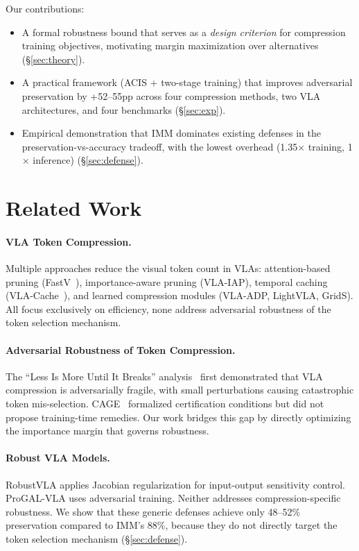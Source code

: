 \documentclass[10pt,twocolumn]{article}
\begin{document}
Our contributions:
\begin{itemize}
    \item A formal robustness bound that serves as a \emph{design criterion} for compression training objectives, motivating margin maximization over alternatives (\S\ref{sec:theory}).
    \item A practical framework (ACIS + two-stage training) that improves adversarial preservation by +52--55pp across four compression methods, two VLA architectures, and four benchmarks (\S\ref{sec:exp}).
    \item Empirical demonstration that IMM dominates existing defenses in the preservation-vs-accuracy tradeoff, with the lowest overhead (1.35$\times$ training, 1$\times$ inference) (\S\ref{sec:defense}).
\end{itemize}

\section{Related Work}
\label{sec:related}

\paragraph{VLA Token Compression.}
Multiple approaches reduce the visual token count in VLAs: attention-based pruning (FastV~\cite{chen2024fastv}), importance-aware pruning (VLA-IAP), temporal caching (VLA-Cache~\cite{zheng2024vlacache}), and learned compression modules (VLA-ADP, LightVLA, GridS). All focus exclusively on efficiency, none address adversarial robustness of the token selection mechanism.

\paragraph{Adversarial Robustness of Token Compression.}
The ``Less Is More Until It Breaks'' analysis~\cite{lessismore2025} first demonstrated that VLA compression is adversarially fragile, with small perturbations causing catastrophic token mis-selection. CAGE~\cite{cage2026} formalized certification conditions but did not propose training-time remedies. Our work bridges this gap by directly optimizing the importance margin that governs robustness.

\paragraph{Robust VLA Models.}
RobustVLA applies Jacobian regularization for input-output sensitivity control. ProGAL-VLA uses adversarial training. Neither addresses compression-specific robustness. We show that these generic defenses achieve only 48--52\% preservation compared to IMM's 88\%, because they do not directly target the token selection mechanism (\S\ref{sec:defense}).
\end{document}
